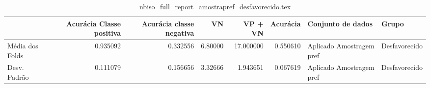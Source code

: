 \begin{table}
\centering
\caption{nbiso_full_report_amostrapref_desfavorecido.tex}
\label{nbiso_full_report_amostrapref_desfavorecido.tex}
\begin{tabular}{lrrrrrll}
\toprule
{} &  Acurácia Classe positiva &  Acurácia classe negativa &      VN  &   VP + VN  &  Acurácia &         Conjunto de dados &          Grupo \\
\midrule
Média dos Folds &                  0.935092 &                  0.332556 &  6.80000 &  17.000000 &  0.550610 &  Aplicado Amostragem pref &  Desfavorecido \\
Desv. Padrão    &                  0.111079 &                  0.156656 &  3.32666 &   1.943651 &  0.067619 &  Aplicado Amostragem pref &  Desfavorecido \\
\bottomrule
\end{tabular}
\end{table}
